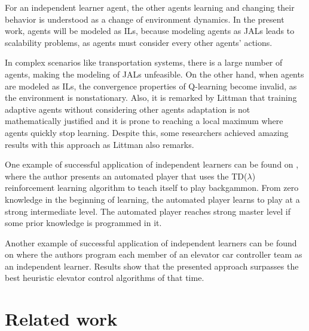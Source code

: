 \documentclass{RITA}
\begin{document}
For an independent learner agent, the other agents learning and changing their behavior is understood as a change of environment dynamics. In the present work, agents will be modeled as ILs, because modeling agents as JALs leads to scalability problems, as agents must consider every other agents' actions. 

In complex scenarios like transportation systems, there is a large number of agents, making the modeling of JALs unfeasible. On the other hand, when agents are modeled as ILs, the convergence properties of Q-learning become invalid, as the environment is nonstationary. Also, it is remarked by Littman \cite{Littman1994} that training adaptive agents without considering other agents adaptation is not mathematically justified and it is prone to reaching a local maximum where agents quickly stop learning. Despite this, some researchers achieved amazing results with this approach as Littman \cite{Littman1994} also remarks.

One example of successful application of independent learners can be found on \cite{Tesauro1994}, where the author presents an automated player that uses the TD($\lambda$) reinforcement learning algorithm \cite{Sutton1988} to teach itself to play backgammon. From zero knowledge in the beginning of learning, the automated player learns to play at a strong intermediate level. The automated player reaches strong master level if some prior knowledge is programmed in it. 

Another example of successful application of independent learners can be found on \cite{Crites&Barto1998} where the authors program each member of an elevator car controller team as an independent learner. Results show that the presented approach surpasses the best heuristic elevator control algorithms of that time.




\section{Related work}
\label{sec:related}
\end{document}
